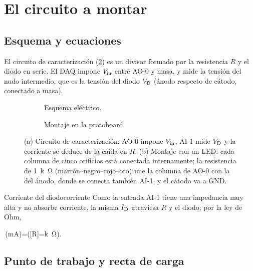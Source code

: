 \documentclass[11pt,a4paper]{article}
\begin{document}
\section{El circuito a montar}
\label{sec:montaje}

\subsection{Esquema y ecuaciones}

El circuito de caracterización (\cref{fig:circuito}) es un divisor formado por
la resistencia $R$ y el diodo en serie. El DAQ impone $V_{\mathrm{in}}$ entre AO-0 y
masa, y mide la tensión del nudo intermedio, que es la tensión del diodo
$V_{\mathrm D}$ (ánodo respecto de cátodo, conectado a masa).

\begin{figure}[htbp]
  \centering
  \begin{subfigure}[b]{0.43\linewidth}\centering
    
    \caption{Esquema eléctrico.}
  \end{subfigure}\hfill
  \begin{subfigure}[b]{0.55\linewidth}\centering
    
    \caption{Montaje en la protoboard.}
    \label{fig:protoboard}
  \end{subfigure}
  \caption{(a) Circuito de caracterización: AO-0 impone $V_{\mathrm{in}}$, AI-1 mide
  $V_{\mathrm D}$ y la corriente se deduce de la caída en $R$. (b) Montaje con un LED:
  cada columna de cinco orificios está conectada internamente; la resistencia
  de \SI{1}{k\ohm} (marrón--negro--rojo--oro) une la columna de AO-0 con la
  del ánodo, donde se conecta también AI-1, y el cátodo va a GND.}
  \label{fig:circuito}
\end{figure}

\begin{proposicion}{Corriente del diodo}{corriente}
  Como la entrada AI-1 tiene una impedancia muy alta y no absorbe corriente,
  la misma $I_{\mathrm D}$ atraviesa $R$ y el diodo; por la ley de Ohm,
  \begin{destacada}
    \ID\,(\si{mA})=\qquad\bigl([R]=\si{k\ohm}\bigr).
    \label{eq:ohm}
  \end{destacada}
\end{proposicion}

\subsection{Punto de trabajo y recta de carga}
\end{document}

